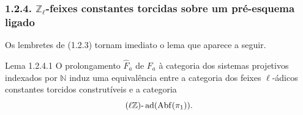 \subsubsection*{1.2.4. \(\mathbb Z_\ell\)-feixes constantes torcidas sobre um pré-esquema ligado}

Os lembretes de (1.2.3) tornam imediato o lema que aparece a seguir.

\begin{statement}{Lema 1.2.4.1}
O prolongamento \(\widehat F_a\) de \(F_a\) à categoria dos sistemas projetivos indexados por \(\mathbb N\) induz uma equivalência entre a categoria dos feixes \(\ell\)-ádicos constantes torcidos construtíveis e a categoria
\[
(\ell\mathbb Z)\text{-}\operatorname{ad}(\operatorname{Abf}(\pi_1)).
\]
\end{statement}
